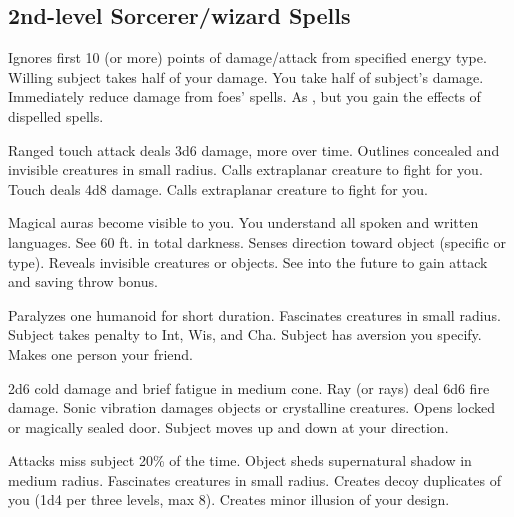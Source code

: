 \subsection{2nd-level Sorcerer/wizard Spells} 
\begin{swspelllist}
 Ignores first 10 (or more) points of damage/attack from specified energy type.
 Willing subject takes half of your damage.
 You take half of subject's damage.
 Immediately reduce damage from foes' spells.
 As , but you gain the effects of dispelled spells.

 Ranged touch attack deals 3d6 damage, more over time.
 Outlines concealed and invisible creatures in small radius.
 Calls extraplanar creature to fight for you.
 Touch deals 4d8 damage.
 Calls extraplanar creature to fight for you.

 Magical auras become visible to you.
 You understand all spoken and written languages.
 See 60 ft. in total darkness.
 Senses direction toward object (specific or type).
 Reveals invisible creatures or objects.
\spellheadrestricted{}
 See into the future to gain attack and saving throw bonus.

 Paralyzes one humanoid for short duration.
 Fascinates creatures in small radius.
 Subject takes  penalty to Int, Wis, and Cha.
 Subject has aversion you specify.
 Makes one person your friend.

 2d6 cold damage and brief fatigue in medium cone.
 Ray (or rays) deal 6d6 fire damage.
 Sonic vibration damages objects or crystalline creatures.
 Opens locked or magically sealed door.
 Subject moves up and down at your direction.

 Attacks miss subject 20\% of the time.
 Object sheds supernatural shadow in medium radius.
 Fascinates creatures in small radius.
 Creates decoy duplicates of you (1d4  per three levels, max 8).
 Creates minor illusion of your design.


\end{swspelllist}
